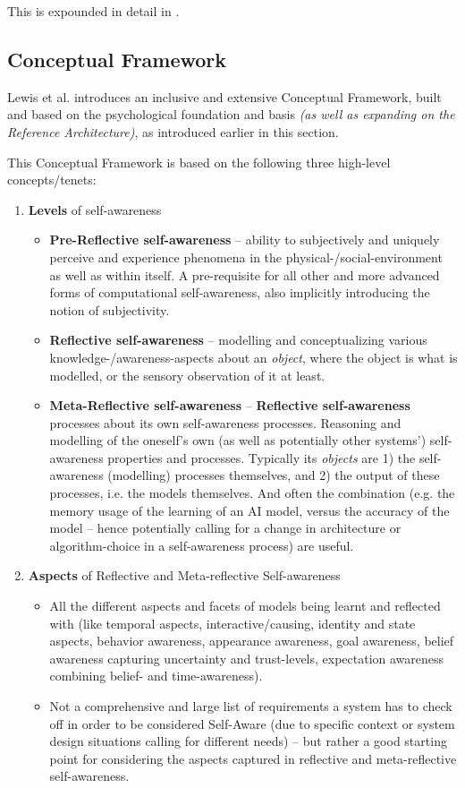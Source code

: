 	This is expounded in detail in \cite{sacs16_ch4}.


	\subsection{Conceptual Framework}

	Lewis et al. \cite{sacs17_ch3} introduces an inclusive and extensive Conceptual Framework, built and based on the psychological foundation and basis \textit{(as well as expanding on the Reference Architecture)}, as introduced earlier in this section.

	This Conceptual Framework is based on the following three high-level concepts/tenets:
	\begin{enumerate}
		\item \textbf{Levels} of self-awareness
		\begin{itemize}
			\item \textbf{Pre-Reflective self-awareness} -- ability to subjectively and uniquely perceive and experience phenomena in the physical-/social-environment as well as within itself. A pre-requisite for all other and more advanced forms of computational self-awareness, also implicitly introducing the notion of subjectivity.
			\item \textbf{Reflective self-awareness} -- modelling and conceptualizing various knowledge-/awareness-aspects about an \textit{object}, where the object is what is modelled, or the sensory observation of it at least.
			\item \textbf{Meta-Reflective self-awareness} -- \textbf{Reflective self-awareness} processes about its own self-awareness processes. Reasoning and modelling of the oneself's own (as well as potentially other systems') self-awareness properties and processes. Typically its \textit{objects} are 1) the self-awareness (modelling) processes themselves, and 2) the output of these processes, i.e. the models themselves. And often the combination (e.g. the memory usage of the learning of an AI model, versus the accuracy of the model -- hence potentially calling for a change in architecture or algorithm-choice in a self-awareness process) are useful.
		\end{itemize}
		
		\item \textbf{Aspects} of Reflective and Meta-reflective Self-awareness
			\begin{itemize}
				\item All the different aspects and facets of models being learnt and reflected with (like temporal aspects, interactive/causing, identity and state aspects, behavior awareness, appearance awareness, goal awareness, belief awareness capturing uncertainty and trust-levels, expectation awareness combining belief- and time-awareness).
				\item Not a comprehensive and large list of requirements a system has to check off in order to be considered Self-Aware (due to specific context or system design situations calling for different needs) -- but rather a good starting point for considering the aspects captured in reflective and meta-reflective self-awareness.
			\end{itemize}
			

\end{enumerate}
